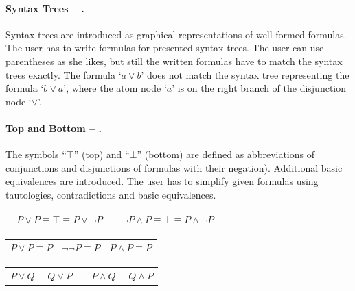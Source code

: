\paragraph{Syntax Trees – .}
\label{tut:24}
Syntax trees  are introduced as graphical representations of well formed formulas. 
The user has to write formulas for presented syntax trees. 
The user can use parentheses as she likes, but still the written formulas have to match the syntax trees exactly. 
The formula ‘$a \vee b$’ does not match the syntax tree representing the formula ‘$b \vee a$’, 
where the atom node ‘$a$’ is on the right branch of the disjunction node ‘$\vee$’.

\paragraph{Top and Bottom – .}
\label{tut:25}
The symbols “$\top$” (top) and “$ \bot$” (bottom) are defined
as abbreviations of conjunctions and disjunctions 
of formulas with their negation). Additional basic equivalences are introduced.
The user has to simplify given formulas using tautologies, contradictions and basic equivalences.
\begin{center}
\begin{tabular}{cp{0.1cm}c}
$\neg P \vee P \equiv \top \equiv P \vee \neg P$  & &
$\neg P \wedge P \equiv \bot \equiv  P \wedge \neg P$
\end{tabular}
\begin{tabular}{ccc}
$P \vee P \equiv P$ &
$\neg \neg P \equiv P$ & 
$P \wedge P \equiv P$
\end{tabular}
\begin{tabular}{cp{1cm}c}
$P \vee Q \equiv Q \vee P$ & &
$P \wedge Q \equiv Q \wedge P$
\end{tabular}
\end{center}




